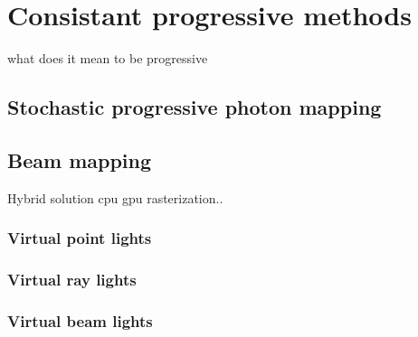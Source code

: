 \chapter{Consistant progressive methods}
what does it mean to be progressive
\section{Stochastic progressive photon mapping}

\section{Beam mapping}
Hybrid solution cpu gpu rasterization..
\subsection{Virtual point lights}

\subsection{Virtual ray lights}

\subsection{Virtual beam lights}





